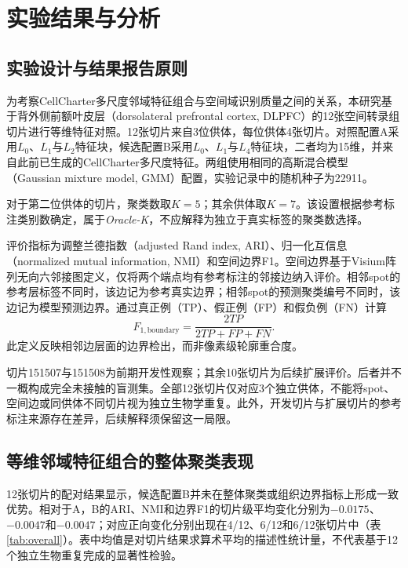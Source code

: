 \documentclass[UTF8,a4paper,12pt]{ctexart}
\begin{document}
\section{实验结果与分析}
\label{sec:results}

\subsection{实验设计与结果报告原则}
\label{subsec:design}
为考察CellCharter多尺度邻域特征组合与空间域识别质量之间的关系，本研究基于背外侧前额叶皮层（dorsolateral prefrontal cortex, DLPFC）的12张空间转录组切片进行等维特征对照。12张切片来自3位供体，每位供体4张切片。对照配置A采用$L_0$、$L_1$与$L_2$特征块，候选配置B采用$L_0$、$L_1$与$L_4$特征块，二者均为15维，并来自此前已生成的CellCharter多尺度特征。两组使用相同的高斯混合模型（Gaussian mixture model, GMM）配置，实验记录中的随机种子为22911。

对于第二位供体的切片，聚类数取$K=5$；其余供体取$K=7$。该设置根据参考标注类别数确定，属于\textit{Oracle-K}，不应解释为独立于真实标签的聚类数选择。

评价指标为调整兰德指数（adjusted Rand index, ARI）、归一化互信息（normalized mutual information, NMI）和空间边界F1。空间边界基于Visium阵列无向六邻接图定义，仅将两个端点均有参考标注的邻接边纳入评价。相邻spot的参考层标签不同时，该边记为参考真实边界；相邻spot的预测聚类编号不同时，该边记为模型预测边界。通过真正例（TP）、假正例（FP）和假负例（FN）计算
\begin{equation}
  F_{1,\mathrm{boundary}}=\frac{2TP}{2TP+FP+FN}.
  \label{eq:boundaryf1}
\end{equation}
此定义反映相邻边层面的边界检出，而非像素级轮廓重合度。

切片151507与151508为前期开发性观察；其余10张切片为后续扩展评价。后者并不一概构成完全未接触的盲测集。全部12张切片仅对应3个独立供体，不能将spot、空间边或同供体不同切片视为独立生物学重复。此外，开发切片与扩展切片的参考标注来源存在差异，后续解释须保留这一局限。

\subsection{等维邻域特征组合的整体聚类表现}
\label{subsec:overall}
12张切片的配对结果显示，候选配置B并未在整体聚类或组织边界指标上形成一致优势。相对于A，B的ARI、NMI和边界F1的切片级平均变化分别为$-0.0175$、$-0.0047$和$-0.0047$；对应正向变化分别出现在4/12、6/12和6/12张切片中（表\ref{tab:overall}）。表中均值是对切片结果求算术平均的描述性统计量，不代表基于12个独立生物重复完成的显著性检验。
\end{document}
